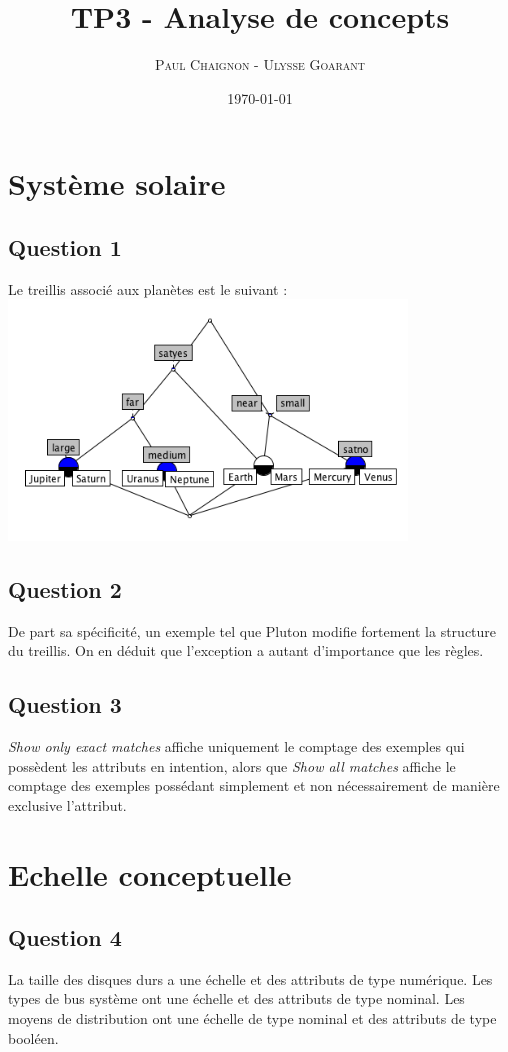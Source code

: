 \documentclass[a4paper,12pt]{article}
\title{TP3 - Analyse de concepts}
\author{\textsc{Paul Chaignon} - \textsc{Ulysse Goarant}}
\date{\today}
\begin{document}
\lstset{language=Prolog, breaklines=true}

\maketitle

\section{Système solaire}
\subsection{Question 1}
Le treillis associé aux planètes est le suivant :
\includegraphics[width=400px]{question1.png}

\subsection{Question 2}
De part sa spécificité, un exemple tel que Pluton modifie fortement la structure du treillis. On en déduit que l'exception a autant d'importance que les règles.

\subsection{Question 3}
\textit{Show only exact matches} affiche uniquement le comptage des exemples qui possèdent les attributs en intention, alors que \textit{Show all matches} affiche le comptage des exemples possédant simplement et non nécessairement de manière exclusive l'attribut.

\section{Echelle conceptuelle}
\subsection{Question 4}
La taille des disques durs a une échelle et des attributs de type numérique. Les types de bus système ont une échelle et des attributs de type nominal. Les moyens de distribution ont une échelle de type nominal et des attributs de type booléen.
\end{document}
